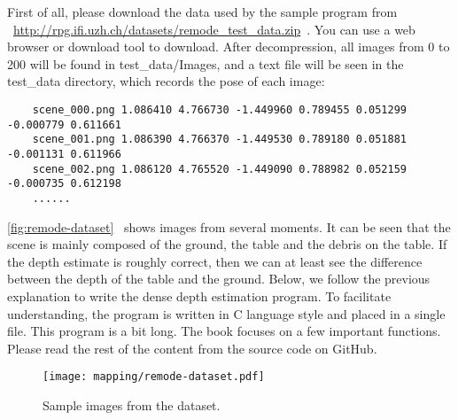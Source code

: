 First of all, please download the data used by the sample program from ~\url{http://rpg.ifi.uzh.ch/datasets/remode_test_data.zip}~. You can use a web browser or download tool to download. After decompression, all images from 0 to 200 will be found in test\_data/Images, and a text file will be seen in the test\_data directory, which records the pose of each image:
\begin{lstlisting}
	scene_000.png 1.086410 4.766730 -1.449960 0.789455 0.051299 -0.000779 0.611661
	scene_001.png 1.086390 4.766370 -1.449530 0.789180 0.051881 -0.001131 0.611966
	scene_002.png 1.086120 4.765520 -1.449090 0.788982 0.052159 -0.000735 0.612198
	......
\end{lstlisting}

\autoref{fig:remode-dataset}~ shows images from several moments. It can be seen that the scene is mainly composed of the ground, the table and the debris on the table. If the depth estimate is roughly correct, then we can at least see the difference between the depth of the table and the ground. Below, we follow the previous explanation to write the dense depth estimation program. To facilitate understanding, the program is written in C language style and placed in a single file. This program is a bit long. The book focuses on a few important functions. Please read the rest of the content from the source code on GitHub.

\begin{figure}[!ht]
	\centering
	\texttt{[image: mapping/remode-dataset.pdf]}
	\caption{Sample images from the dataset.}
	\label{fig:remode-dataset}
\end{figure}

